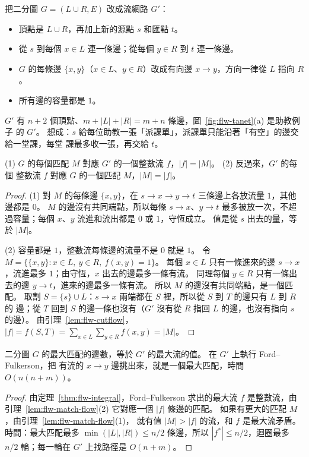 把二分圖 $G = (L \cup R, E)$ 改成流網路 $G'$：
\begin{itemize}
\item 頂點是 $L \cup R$，再加上新的源點 $s$ 和匯點 $t$。
\item 從 $s$ 到每個 $x \in L$ 連一條邊；從每個 $y \in R$ 到 $t$ 連一條邊。
\item $G$ 的每條邊 $\{x, y\}$（$x \in L$、$y \in R$）改成有向邊 $x \to y$，方向一律從 $L$
指向 $R$。
\item 所有邊的容量都是 $1$。
\end{itemize}
$G'$ 有 $n + 2$ 個頂點、$m + |L| + |R| = m + n$ 條邊，圖~\ref{fig:flw-tanet}(a) 是助教例子
的 $G'$。 想成：$s$ 給每位助教一張「派課單」，派課單只能沿著「有空」的邊交給一堂課，每堂
課最多收一張，再交給 $t$。

\begin{lemma}
\label{lem:flw-match-flow}
(1) $G$ 的每個匹配 $M$ 對應 $G'$ 的一個整數流 $f$，$|f| = |M|$。 (2) 反過來，$G'$ 的每個
整數流 $f$ 對應 $G$ 的一個匹配 $M$，$|M| = |f|$。
\end{lemma}

\begin{proof}
(1) 對 $M$ 的每條邊 $\{x, y\}$，在 $s \to x \to y \to t$ 三條邊上各放流量 $1$，其他邊都是
$0$。 $M$ 的邊沒有共同端點，所以每條 $s \to x$、$y \to t$ 最多被放一次，不超過容量；每個
$x$、$y$ 流進和流出都是 $0$ 或 $1$，守恆成立。 值是從 $s$ 出去的量，等於 $|M|$。

(2) 容量都是 $1$，整數流每條邊的流量不是 $0$ 就是 $1$。 令
$M = \{\{x, y\} : x \in L,\ y \in R,\ f(x, y) = 1\}$。 每個 $x \in L$ 只有一條進來的邊
$s \to x$，流進最多 $1$；由守恆，$x$ 出去的邊最多一條有流。 同理每個 $y \in R$ 只有一條出
去的邊 $y \to t$，進來的邊最多一條有流。 所以 $M$ 的邊沒有共同端點，是一個匹配。 取割
$S = \{s\} \cup L$：$s \to x$ 兩端都在 $S$ 裡，所以從 $S$ 到 $T$ 的邊只有 $L$ 到 $R$ 的
邊；從 $T$ 回到 $S$ 的邊一條也沒有（$G'$ 沒有從 $R$ 指回 $L$ 的邊，也沒有指向 $s$ 的邊）。
由引理~\ref{lem:flw-cutflow}，
$|f| = f(S, T) = \sum_{x \in L} \sum_{y \in R} f(x, y) = |M|$。
\end{proof}

\begin{theorem}
\label{thm:flw-match}
二分圖 $G$ 的最大匹配的邊數，等於 $G'$ 的最大流的值。 在 $G'$ 上執行 Ford--Fulkerson，把
有流的 $x \to y$ 邊挑出來，就是一個最大匹配，時間 $O(n(n + m))$。
\end{theorem}

\begin{proof}
由定理~\ref{thm:flw-integral}，Ford--Fulkerson 求出的最大流 $f$ 是整數流，由引理~\ref{lem:flw-match-flow}(2)
它對應一個 $|f|$ 條邊的匹配。 如果有更大的匹配 $M$，由引理~\ref{lem:flw-match-flow}(1)，
就有值 $|M| > |f|$ 的流，和 $f$ 是最大流矛盾。 時間：最大匹配最多 $\min(|L|, |R|) \le n/2$
條邊，所以 $|f^{*}| \le n/2$，迴圈最多 $n/2$ 輪；每一輪在 $G'$ 上找路徑是
$O(n + m)$。
\end{proof}

